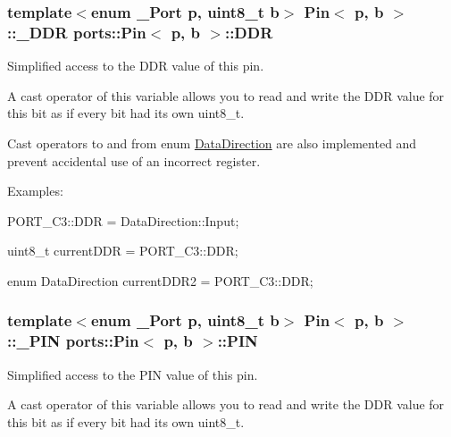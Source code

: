 \subsubsection[{\texorpdfstring{D\+DR}{DDR}}]{\setlength{\rightskip}{0pt plus 5cm}template$<$enum \+\_\+\+Port p, uint8\+\_\+t b$>$ {\bf Pin}$<$ p, b $>$\+::{\bf \+\_\+\+D\+DR} {\bf ports\+::\+Pin}$<$ p, b $>$\+::D\+DR\hspace{0.3cm}{\ttfamily [static]}}\hypertarget{structports_1_1Pin_aaebb4d6cb5db0635fe8e7d6e7d315c7f}{}\label{structports_1_1Pin_aaebb4d6cb5db0635fe8e7d6e7d315c7f}


Simplified access to the D\+DR value of this pin. 

A cast operator of this variable allows you to read and write the D\+DR value for this bit as if every bit had its own {\ttfamily uint8\+\_\+t}.

Cast operators to and from enum \hyperlink{namespaceports_a46987e78fa447129742fadda5eccafb4}{Data\+Direction} are also implemented and prevent accidental use of an incorrect register.

Examples\+:


\begin{DoxyItemize}
\item {\ttfamily P\+O\+R\+T\+\_\+\+C3\+::\+D\+DR = Data\+Direction\+::\+Input;}
\item {\ttfamily uint8\+\_\+t current\+D\+DR = P\+O\+R\+T\+\_\+\+C3\+::\+D\+DR;}
\item {\ttfamily enum Data\+Direction current\+D\+D\+R2 = P\+O\+R\+T\+\_\+\+C3\+::\+D\+DR;} 
\end{DoxyItemize}
\subsubsection[{\texorpdfstring{P\+IN}{PIN}}]{\setlength{\rightskip}{0pt plus 5cm}template$<$enum \+\_\+\+Port p, uint8\+\_\+t b$>$ {\bf Pin}$<$ p, b $>$\+::{\bf \+\_\+\+P\+IN} {\bf ports\+::\+Pin}$<$ p, b $>$\+::P\+IN\hspace{0.3cm}{\ttfamily [static]}}\hypertarget{structports_1_1Pin_ae2e45a41082457c350f71f7a720265d4}{}\label{structports_1_1Pin_ae2e45a41082457c350f71f7a720265d4}


Simplified access to the P\+IN value of this pin. 

A cast operator of this variable allows you to read and write the D\+DR value for this bit as if every bit had its own uint8\+\_\+t.

